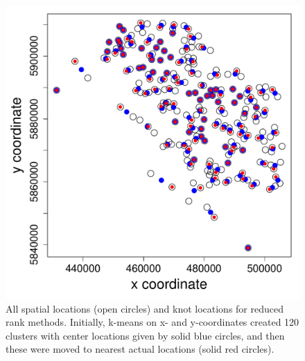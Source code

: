 \documentclass[11pt, titlepage]{article}\usepackage[]{graphicx}\usepackage[]{color}
\begin{document}
\begin{spacing}{1.9}
\begin{flushleft}
\begin{singlespace}
	\begin{figure}[H]
	  \begin{center}
	    \includegraphics[width=.7\linewidth]{figure/reduRank-1.pdf}
	  \end{center}
	  \caption{All spatial locations (open circles) and knot locations for reduced rank methods.  Initially, k-means on x- and y-coordinates created 120 clusters with center locations given by solid blue circles, and then these were moved to nearest actual locations (solid red circles).   \label{fig:reduRank}}
  \end{figure}

\end{singlespace}



\end{flushleft}
\end{spacing}
\end{document}
